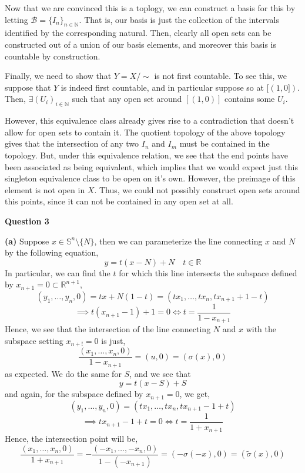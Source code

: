 \documentclass[10pt]{article}
\newcommand{\R}{\mathbb{R}}
\newcommand{\N}{\mathbb{N}}
\newcommand{\Sp}{\mathbb{S}}
\begin{document}
Now that we are convinced this is a toplogy, we can construct a basis for this by letting $\mathcal{B} = \{I_{n}\}_{n\in \N}$. That is, our basis is just the collection of the intervals identified by the corresponding natural. Then, clearly all open sets can be constructed out of a union of our basis elements, and moreover this basis is countable by construction.

Finally, we need to show that $Y = X/\sim$ is not first countable. To see this, we suppose that $Y$ is indeed first countable, and in particular suppose so at $[(1,0])$. Then, $\exists (U_{i})_{i\in\N}$ such that any open set around $[(1,0)]$ contains some $U_{i}$.

However, this equivalence class already gives rise to a contradiction that doesn't allow for open sets to contain it. The quotient topology of the above topology gives that the intersection of any two $I_{n}$ and $I_{m}$ must be contained in the topology. But, under this equivalence relation, we see that the end points have been associated as being equivalent, which implies that we would expect just this singleton equivalence class to be open on it's own. However, the preimage of this element is not open in $X$. Thus, we could not possibly construct open sets around this points, since it can not be contained in any open set at all.

\newpage

\textbf{Question 3}

\textbf{(a)} Suppose $x\in \Sp^{n}\setminus \{N\}$, then we can parameterize the line connecting $x$ and $N$ by the following equation,
$$y = t(x-N)+ N \hspace{1em} t\in \R$$
In particular, we can find the $t$ for which this line intersects the subspace defined by $x_{n+1} = 0 \subset \R^{n+1}$,
$$(y_{1}, \dots, y_{n}, 0) = tx + N(1-t) = (tx_{1}, \dots, tx_{n}, tx_{n+1} + 1 - t)$$
$$ \implies t(x_{n+1} - 1) + 1 = 0 \iff t = \frac{1}{1-x_{n+1}}$$
Hence, we see that the intersection of the line connecting $N$ and $x$ with the subspace setting $x_{n+!} = 0$ is just,
$$\frac{(x_{1},\dots,x_{n},0)}{1-x_{n+1}} = (u,0) = (\sigma(x),0) $$
as expected. We do the same for $S$, and we see that
$$y = t(x-S) + S$$
and again, for the subspace defined by $x_{n+1}= 0$, we get,
$$ (y_{1}, \dots, y_{n}, 0) = (tx_{1},\dots,tx_{n},tx_{n+1} -1 +t)$$
$$ \implies tx_{n+1} -1 +t = 0 \iff t = \frac{1}{1 + x_{n+1}}$$
Hence, the intersection point will be,
$$\frac{(x_{1},\dots,x_{n},0)}{1+x_{n+1}} = -\frac{(-x_{1},\dots,-x_{n},0)}{1-(-x_{n+1})} = (-\sigma(-x),0) = (\tilde{\sigma}(x),0)$$
\end{document}
